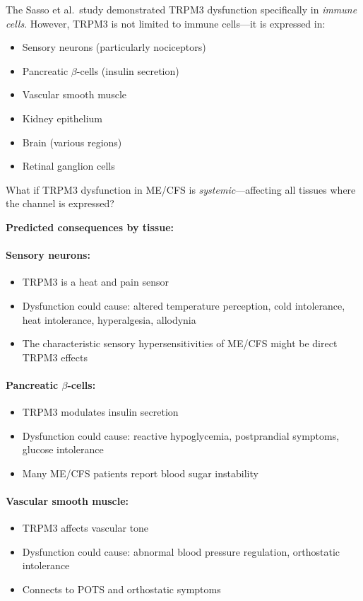 \begin{open_question}
The Sasso et al.\ study demonstrated TRPM3 dysfunction specifically in \textit{immune cells}. However, TRPM3 is not limited to immune cells---it is expressed in:
\begin{itemize}
    \item Sensory neurons (particularly nociceptors)
    \item Pancreatic $\beta$-cells (insulin secretion)
    \item Vascular smooth muscle
    \item Kidney epithelium
    \item Brain (various regions)
    \item Retinal ganglion cells
\end{itemize}

What if TRPM3 dysfunction in ME/CFS is \textit{systemic}---affecting all tissues where the channel is expressed?

\textbf{Predicted consequences by tissue:}

\paragraph{Sensory neurons:}
\begin{itemize}
    \item TRPM3 is a heat and pain sensor
    \item Dysfunction could cause: altered temperature perception, cold intolerance, heat intolerance, hyperalgesia, allodynia
    \item The characteristic sensory hypersensitivities of ME/CFS might be direct TRPM3 effects
\end{itemize}

\paragraph{Pancreatic $\beta$-cells:}
\begin{itemize}
    \item TRPM3 modulates insulin secretion
    \item Dysfunction could cause: reactive hypoglycemia, postprandial symptoms, glucose intolerance
    \item Many ME/CFS patients report blood sugar instability
\end{itemize}

\paragraph{Vascular smooth muscle:}
\begin{itemize}
    \item TRPM3 affects vascular tone
    \item Dysfunction could cause: abnormal blood pressure regulation, orthostatic intolerance
    \item Connects to POTS and orthostatic symptoms
\end{itemize}


\end{open_question}
